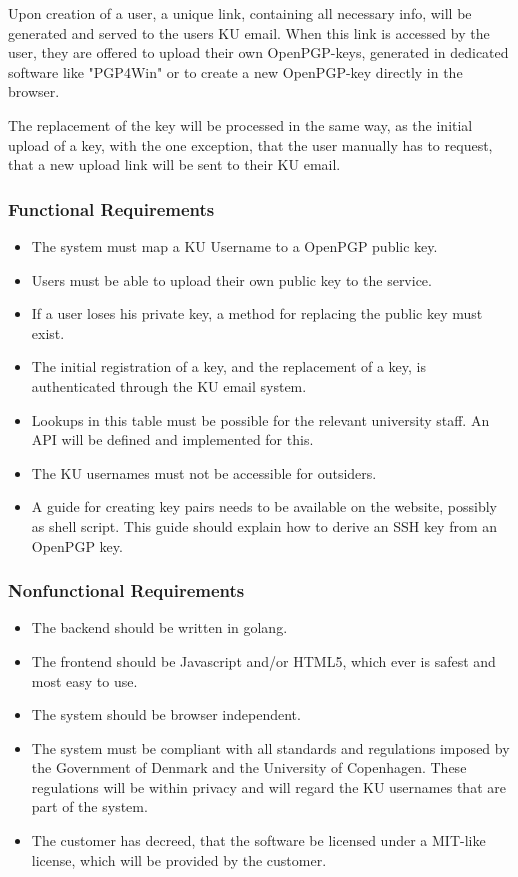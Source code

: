 \documentclass[11pt,a4paper]{report}
\begin{document}
Upon creation of a user, a unique link, containing all necessary info, will be generated and served to the users KU email. When this link is accessed by the user, they are offered to upload their own OpenPGP-keys, generated in dedicated software like "PGP4Win" or to create a new OpenPGP-key directly in the browser.

The replacement of the key will be processed in the same way, as the initial upload of a key, with the one exception, that the user manually has to request, that a new upload link will be sent to their KU email.


\subsubsection{Functional Requirements}\label{Functional_Requirements}
\begin{itemize}
\item The system must map a KU Username to a OpenPGP public key.
\item Users must be able to upload their own public key to the service.
\item If a user loses his private key, a method for replacing the public key must exist.
\item The initial registration of a key, and the replacement of a key, is authenticated through the KU email system.
\item Lookups in this table must be possible for the relevant university staff. An API will be defined and implemented for this.
\item The KU usernames must not be accessible for outsiders.
\item A guide for creating key pairs needs to be available on the website, possibly as shell script. This guide should explain how to derive an SSH key from an OpenPGP key.
\end{itemize}
\subsubsection{Nonfunctional Requirements}
\begin{itemize}
\item The backend should be written in golang.
\item The frontend should be Javascript and/or HTML5, which ever is safest and most easy to use.
\item The system should be browser independent.
\item The system must be compliant with all standards and regulations imposed by the Government of Denmark and the University of Copenhagen. These regulations will be within privacy and will regard the KU usernames that are part of the system.
\item The customer has decreed, that the software be licensed under a MIT-like license, which will be provided by the customer.
\end{itemize}
\end{document}
